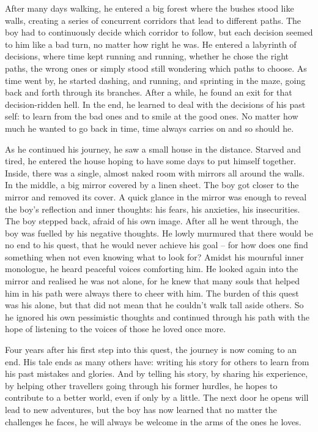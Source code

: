 After many days walking, he entered a big forest where the bushes stood like walls, creating a series of concurrent corridors that lead to different paths. The boy had to continuously decide which corridor to follow, but each decision seemed to him like a bad turn, no matter how right he was. He entered a labyrinth of decisions, where time kept running and running, whether he chose the right paths, the wrong ones or simply stood still wondering which paths to choose. As time went by, he started dashing, and running, and sprinting in the maze, going back and forth through its branches. After a while, he found an exit for that decision-ridden hell. In the end, he learned to deal with the decisions of his past self: to learn from the bad ones and to smile at the good ones. No matter how much he wanted to go back in time, time always carries on and so should he.

As he continued his journey, he saw a small house in the distance. Starved and tired, he entered the house hoping to have some days to put himself together. Inside, there was a single, almost naked room with mirrors all around the walls. In the middle, a big mirror covered by a linen sheet. The boy got closer to the mirror and removed its cover. A quick glance in the mirror was enough to reveal the boy's reflection and inner thoughts: his fears, his anxieties, his insecurities. The boy stepped back, afraid of his own image. After all he went through, the boy was fuelled by his negative thoughts. He lowly murmured that there would be no end to his quest, that he would never achieve his goal -- for how does one find something when not even knowing what to look for? Amidst his mournful inner monologue, he heard peaceful voices comforting him. He looked again into the mirror and realised he was not alone, for he knew that many souls that helped him in his path were always there to cheer with him. The burden of this quest was his alone, but that did not mean that he couldn't walk tall aside others. So he ignored his own pessimistic thoughts and continued through his path with the hope of listening to the voices of those he loved once more.

Four years after his first step into this quest, the journey is now coming to an end. His tale ends as many others have: writing his story for others to learn from his past mistakes and glories. And by telling his story, by sharing his experience, by helping other travellers going through his former hurdles, he hopes to contribute to a better world, even if only by a little. The next door he opens will lead to new adventures, but the boy has now learned that no matter the challenges he faces, he will always be welcome in the arms of the ones he loves.
